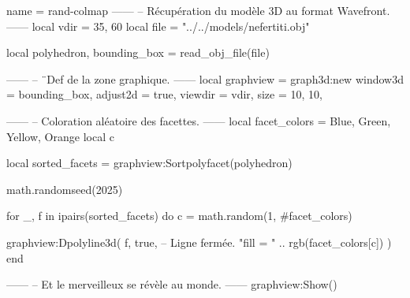 \documentclass{standalone}
\begin{document}
\begin{luadraw}{name = rand-colmap}
------
-- Récupération du modèle 3D au format Wavefront.
------
local vdir = {35, 60}
local file = "../../models/nefertiti.obj"

local polyhedron, bounding_box = read_obj_file(file)

------
-- ¨Def de la zone graphique.
------
local graphview = graph3d:new{
  window3d = bounding_box,
  adjust2d = true,
  viewdir  = vdir,
  size     = {10, 10},
}

------
-- Coloration aléatoire des facettes.
------
local facet_colors = {Blue, Green, Yellow, Orange}
local c

local sorted_facets = graphview:Sortpolyfacet(polyhedron)

math.randomseed(2025)

for _, f in ipairs(sorted_facets) do
  c = math.random(1, #facet_colors)
  
  graphview:Dpolyline3d(
    f,
    true,  -- Ligne fermée.
    "fill = " .. rgb(facet_colors[c])
  )
end

------
-- Et le merveilleux se révèle au monde.
------
graphview:Show()
\end{luadraw}
\end{document}
